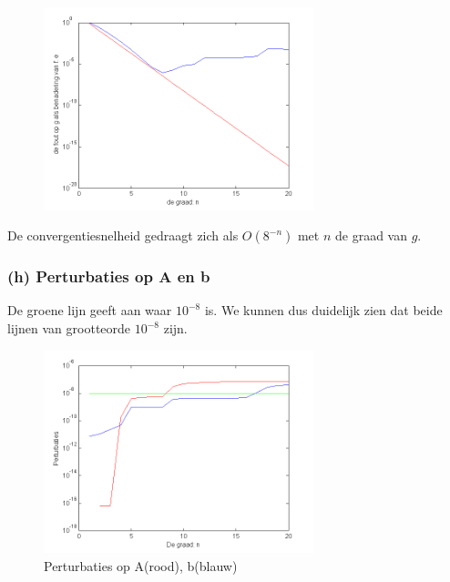 \documentclass[11pt,a4paper]{article}
\begin{document}
\begin{figure}[H]
	\centering
	\vspace{-20pt}
	\includegraphics[width=0.7\textwidth]{22f1.png}
	\vspace{-15pt}
	\end{figure}
De convergentiesnelheid gedraagt zich als $O(8^{-n})$ met $n$ de graad van $g$.
\subsubsection*{(h) Perturbaties op A en b}
De groene lijn geeft aan waar $10^{-8}$ is. We kunnen dus duidelijk zien dat beide lijnen van grootteorde $10^{-8}$ zijn.
\begin{figure}[H]
	\centering
	\vspace{-30pt}
	\includegraphics[width=0.7\textwidth]{22h1.png}
	\caption*{Perturbaties op A(rood), b(blauw)}
	\end{figure}
\vspace{-30pt}
\end{document}
